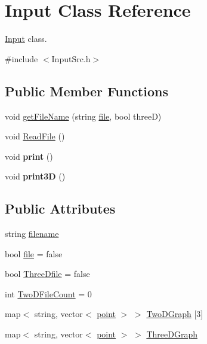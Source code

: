 \hypertarget{classInput}{}\section{Input Class Reference}
\label{classInput}


\hyperlink{classInput}{Input} class.  




{\ttfamily \#include $<$Input\+Src.\+h$>$}

\subsection*{Public Member Functions}
\begin{DoxyCompactItemize}
\item 
void \hyperlink{classInput_a45065353b80f9980111402e827aae0fe}{get\+File\+Name} (string \hyperlink{classInput_ad073fa115ead2e8b7492214215ebd22d}{file}, bool threeD)
\item 
void \hyperlink{classInput_a9d9395f68b01faa00f962791878723a2}{Read\+File} ()
\item 
void {\bfseries print} ()\hypertarget{classInput_a862e529a6ed3fcfd0719274a04174b7d}{}\label{classInput_a862e529a6ed3fcfd0719274a04174b7d}

\item 
void {\bfseries print3D} ()\hypertarget{classInput_aced126e54ffa271b2a40f7e7a5e90376}{}\label{classInput_aced126e54ffa271b2a40f7e7a5e90376}

\end{DoxyCompactItemize}
\subsection*{Public Attributes}
\begin{DoxyCompactItemize}
\item 
string \hyperlink{classInput_af296359065236ac9139aab7736d6844d}{filename}
\item 
bool \hyperlink{classInput_ad073fa115ead2e8b7492214215ebd22d}{file} = false
\item 
bool \hyperlink{classInput_aacb0e034125e32179081a97eecab47df}{Three\+Dfile} = false
\item 
int \hyperlink{classInput_a82141fe9142aec447f9ef52fd2f78c73}{Two\+D\+File\+Count} = 0
\item 
map$<$ string, vector$<$ \hyperlink{structpoint}{point} $>$ $>$ \hyperlink{classInput_a55526617adbcb0db4b3d565f4dbe772d}{Two\+D\+Graph} \mbox{[}3\mbox{]}
\item 
map$<$ string, vector$<$ \hyperlink{structpoint}{point} $>$ $>$ \hyperlink{classInput_aed882deebbb45d8423e5477e8ccaee60}{Three\+D\+Graph}
\end{DoxyCompactItemize}



